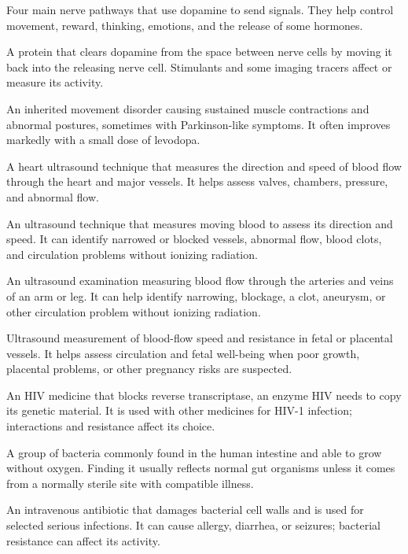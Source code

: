  Four main nerve pathways that use dopamine to send signals. They help control movement, reward, thinking, emotions, and the release of some hormones.

 A protein that clears dopamine from the space between nerve cells by moving it back into the releasing nerve cell. Stimulants and some imaging tracers affect or measure its activity.

 An inherited movement disorder causing sustained muscle contractions and abnormal postures, sometimes with Parkinson-like symptoms. It often improves markedly with a small dose of levodopa.

 A heart ultrasound technique that measures the direction and speed of blood flow through the heart and major vessels. It helps assess valves, chambers, pressure, and abnormal flow.

 An ultrasound technique that measures moving blood to assess its direction and speed. It can identify narrowed or blocked vessels, abnormal flow, blood clots, and circulation problems without ionizing radiation.

 An ultrasound examination measuring blood flow through the arteries and veins of an arm or leg. It can help identify narrowing, blockage, a clot, aneurysm, or other circulation problem without ionizing radiation.

 Ultrasound measurement of blood-flow speed and resistance in fetal or placental vessels. It helps assess circulation and fetal well-being when poor growth, placental problems, or other pregnancy risks are suspected.

 An HIV medicine that blocks reverse transcriptase, an enzyme HIV needs to copy its genetic material. It is used with other medicines for HIV-1 infection; interactions and resistance affect its choice.

 A group of bacteria commonly found in the human intestine and able to grow without oxygen. Finding it usually reflects normal gut organisms unless it comes from a normally sterile site with compatible illness.

 An intravenous antibiotic that damages bacterial cell walls and is used for selected serious infections. It can cause allergy, diarrhea, or seizures; bacterial resistance can affect its activity.

